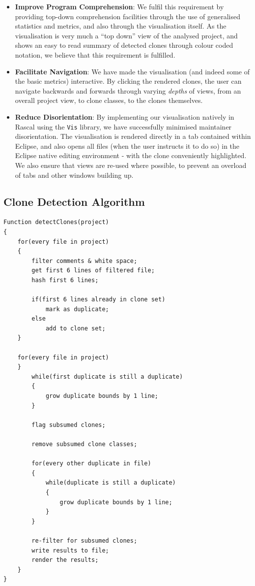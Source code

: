 \documentclass{article}
\begin{document}
\begin{itemize}
\item \textbf{Improve Program Comprehension}: We fulfil this requirement by providing top-down comprehension facilities through the use of generalised statistics and metrics, and also through the visualisation itself. As the visualisation is very much a ``top down'' view of the analysed project, and shows an easy to read summary of detected clones through colour coded notation, we believe that this requirement is fulfilled.
\item \textbf{Facilitate Navigation}: We have made the visualisation (and indeed some of the basic metrics) interactive. By clicking the rendered clones, the user can navigate backwards and forwards through varying \textit{depths} of views, from an overall project view, to clone classes, to the clones themselves.
\item \textbf{Reduce Disorientation}: By implementing our visualisation natively in Rascal using the \texttt{Vis} library, we have successfully minimised maintainer disorientation. The visualisation is rendered directly in a tab contained within Eclipse, and also opens all files (when the user instructs it to do so) in the Eclipse native editing environment - with the clone conveniently highlighted. We also ensure that views are re-used where possible, to prevent an overload of tabs and other windows building up.
\end{itemize}

\subsection{Clone Detection Algorithm}

\begin{lstlisting}[caption=Clone Detection Algorithm,label=lst:algorithm]
Function detectClones(project)
{
    for(every file in project)
    {
        filter comments & white space;
        get first 6 lines of filtered file;
        hash first 6 lines;
        
        if(first 6 lines already in clone set)
            mark as duplicate;
        else
            add to clone set;
    }
    
    for(every file in project)
    }
        while(first duplicate is still a duplicate)
        {
            grow duplicate bounds by 1 line;
        }
        
        flag subsumed clones;
        
        remove subsumed clone classes;
        
        for(every other duplicate in file)
        {
            while(duplicate is still a duplicate)
            {
                grow duplicate bounds by 1 line;
            }
        }
        
        re-filter for subsumed clones;
        write results to file;
        render the results;
    }
}
\end{lstlisting}
\end{document}
